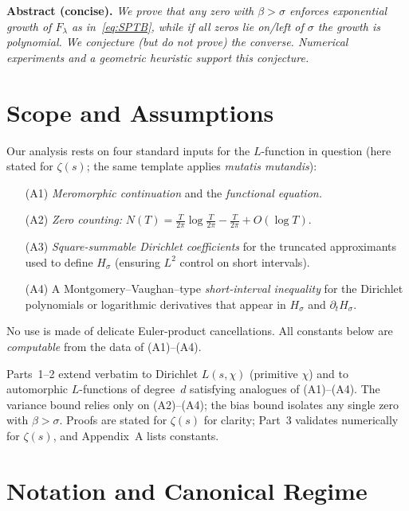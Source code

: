 \medskip
\noindent\textbf{Abstract (concise).}
\emph{We prove that any zero with $\beta>\sigma$ enforces exponential growth of
$F_\lambda$ as in~\eqref{eq:SPTB}, while if all zeros lie on/left of $\sigma$
the growth is polynomial.  We conjecture (but do not prove) the converse.
Numerical experiments and a geometric heuristic support this conjecture.}

\section{Scope and Assumptions}

Our analysis rests on four standard inputs for the $L$-function in question
(here stated for $\zeta(s)$; the same template applies \emph{mutatis mutandis}):

\begin{enumerate}
\item[(A1)] \emph{Meromorphic continuation} and the \emph{functional equation.}
\item[(A2)] \emph{Zero counting:}
$N(T)=\tfrac{T}{2\pi}\log\tfrac{T}{2\pi}-\tfrac{T}{2\pi}+O(\log T)$.
\item[(A3)] \emph{Square-summable Dirichlet coefficients} for the truncated
approximants used to define $H_\sigma$ (ensuring $L^2$ control on short intervals).
\item[(A4)] A Montgomery–Vaughan–type \emph{short-interval inequality} for the Dirichlet
polynomials or logarithmic derivatives that appear in $H_\sigma$ and $\partial_t H_\sigma$.
\end{enumerate}
No use is made of delicate Euler-product cancellations.  All constants below are
\emph{computable} from the data of (A1)–(A4).

\begin{remark}
Parts~1–2 extend verbatim to Dirichlet $L(s,\chi)$ (primitive $\chi$) and to
automorphic $L$-functions of degree~$d$ satisfying analogues of (A1)–(A4).
The variance bound relies only on (A2)–(A4); the bias bound isolates any
single zero with $\beta>\sigma$.  Proofs are stated for $\zeta(s)$ for clarity;
Part~3 validates numerically for $\zeta(s)$, and Appendix~A lists constants.
\end{remark}

\section{Notation and Canonical Regime}

